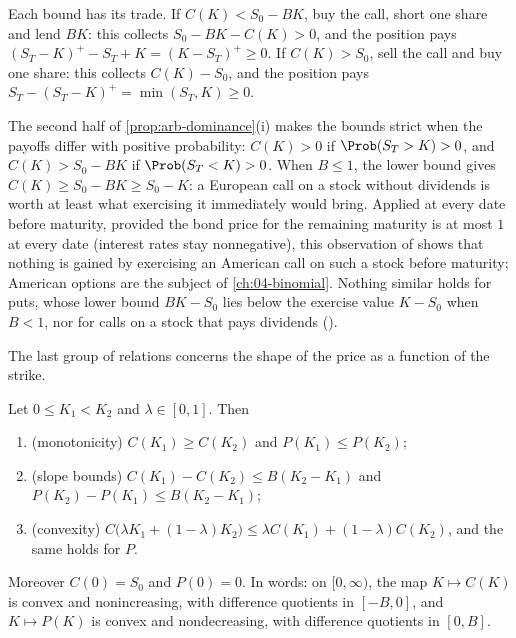 Each bound has its trade. If $C(K)<S_0-BK$, buy the call, short one share and lend $BK$:
this collects $S_0-BK-C(K)>0$, and the position pays $(S_T-K)^+-S_T+K=(K-S_T)^+\ge0$. If
$C(K)>S_0$, sell the call and buy one share: this collects $C(K)-S_0$, and the position pays
$S_T-(S_T-K)^+=\min(S_T,K)\ge0$.

\begin{remark}\label{rem:arb-strict}
The second half of \cref{prop:arb-dominance}(i) makes the bounds strict when the payoffs
differ with positive probability: $C(K)>0$ if $\Prob(S_T>K)>0$, and $C(K)>S_0-BK$ if
$\Prob(S_T<K)>0$. When $B\le1$, the lower bound gives $C(K)\ge S_0-BK\ge S_0-K$: a European
call on a stock without dividends is worth at least what exercising it immediately would
bring. Applied at every date before maturity, provided the bond price for the remaining
maturity is at most $1$ at every date (interest rates stay nonnegative), this observation of
\textcite{merton1973} shows that nothing is gained by exercising an American call on such a
stock before maturity; American options are the subject of \cref{ch:04-binomial}. Nothing similar holds
for puts, whose lower bound $BK-S_0$ lies below the exercise value $K-S_0$ when $B<1$, nor
for calls on a stock that pays dividends ().
\end{remark}

The last group of relations concerns the shape of the price as a function of the strike.

\begin{proposition}\label{prop:arb-strike}
Let $0\le K_1<K_2$ and $\lambda\in[0,1]$. Then
\begin{enumerate}[label=(\roman*)]
  \item (monotonicity) $C(K_1)\ge C(K_2)$ and $P(K_1)\le P(K_2)$;
  \item (slope bounds) $C(K_1)-C(K_2)\le B(K_2-K_1)$ and $P(K_2)-P(K_1)\le B(K_2-K_1)$;
  \item (convexity) $C\big(\lambda K_1+(1-\lambda)K_2\big)\le\lambda C(K_1)+(1-\lambda)C(K_2)$,
    and the same holds for $P$.
\end{enumerate}
Moreover $C(0)=S_0$ and $P(0)=0$. In words: on $[0,\infty)$, the map $K\mapsto C(K)$ is
convex and nonincreasing, with difference quotients in $[-B,0]$, and $K\mapsto P(K)$ is
convex and nondecreasing, with difference quotients in $[0,B]$.
\end{proposition}

